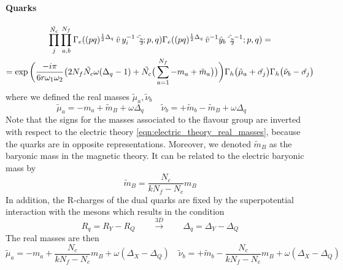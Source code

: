 \paragraph{Quarks}
\begin{multline}
 \prod_{ j }^{\tilde{N_c}} \prod_{ a,b }^{N_f}  \Gamma_e ( (pq)^{{1 \over 2 } \Delta_q} \, \tilde{v} \, y_i^{-1} \tilde{\tilde{z}_j} ; p,q)\Gamma_e ( (pq)^{{1 \over 2 } \Delta_q} \, \tilde{v}^{-1} \tilde y_b \tilde{\tilde{z}_j}^{-1} ; p,q)  = \\
	=   \exp \bigg( \frac{- i \pi }{6 r \omega_1 \omega_2} \big( 2  N_f \tilde{N_c}\omega (\Delta_q - 1 ) +  \tilde{N_c} \big( \sum_{a=1}^{N_f} - m_a + \tilde{m}_a \big)  \big) \bigg)  \Gamma_h \big(\tilde{ \mu}_a + \tilde{\sigma_j} \big) \Gamma_h \big( \tilde{\nu}_b - \tilde{\sigma_j} \big)
\end{multline}
where we defined the real masses $\tilde{\mu}_a,\tilde{\nu}_b$
\begin{equation}
\tilde{\mu}_a = - m_a + \tilde{m}_B + \omega \Delta_q \qquad 
\tilde{\nu}_b = + \tilde{m}_b - \tilde{m}_B + \omega \Delta_q \qquad 
\end{equation}
Note that the signs for the masses associated to the flavour group are inverted with respect to the electric theory \eqref{eqn:electric_theory_real_masses}, because the quarks are in opposite representations.
Moreover, we denoted $\tilde{m}_B$ as the baryonic mass in the magnetic theory.
It can be related to the electric baryonic mass by
\begin{equation}
 \tilde{m}_B = \frac{N_c}{k N_f - N_c} m_B
 \end{equation} 
In addition, the R-charges of the dual quarks are fixed by the superpotential interaction with the mesons which results in the condition
\begin{equation}
R_q = R_Y - R_Q \qquad \overset{3D}{\longrightarrow} \qquad \Delta_q = \Delta_Y - \Delta_Q
\end{equation}
The real masses are then
\begin{equation}
\tilde{\mu}_a = - m_a + \frac{N_c}{k N_f - N_c} m_B + \omega (\Delta_X - \Delta_Q) \quad 
\tilde{\nu}_b = + \tilde{m}_b - \frac{N_c}{k N_f - N_c} m_B + \omega (\Delta_X - \Delta_Q)
\end{equation}




